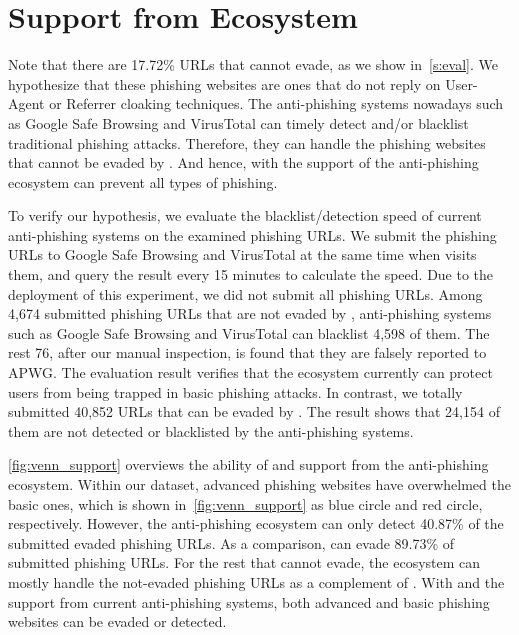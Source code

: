 \section{Support from Ecosystem}

Note that there are 17.72\% URLs that \spartacus cannot evade,
as we show in~\autoref{s:eval}.
We hypothesize that these phishing websites are ones that do not reply on User-Agent or Referrer cloaking techniques.
The anti-phishing systems nowadays such as Google Safe Browsing and VirusTotal can timely detect and/or blacklist traditional phishing attacks.
Therefore, they can handle the phishing websites that cannot be evaded by \spartacus.
And hence, \spartacus with the support of the anti-phishing ecosystem can prevent all types of phishing.

To verify our hypothesis, we evaluate the blacklist/detection speed of current anti-phishing systems on the examined phishing URLs.
We submit the phishing URLs to Google Safe Browsing and VirusTotal at the same time when \spartacus visits them, and query the result every 15 minutes to calculate the speed.
Due to the deployment of this experiment, we did not submit all phishing URLs.
Among 4,674 submitted phishing URLs that are not evaded by \spartacus, anti-phishing systems such as Google Safe Browsing and VirusTotal can blacklist 4,598 of them.
The rest 76, after our manual inspection, is found that they are falsely reported to APWG.
The evaluation result verifies that the ecosystem currently can protect users from being trapped in basic phishing attacks.
In contrast, we totally submitted 40,852 URLs that can be evaded by \spartacus.
The result shows that 24,154 of them are not detected or blacklisted by the anti-phishing systems.



\autoref{fig:venn_support} overviews the ability of \spartacus and support from the anti-phishing ecosystem.
Within our dataset, advanced phishing websites have overwhelmed the basic ones, which is shown in~\autoref{fig:venn_support} as blue circle and red circle, respectively.
However, the anti-phishing ecosystem can only detect 40.87\% of the submitted evaded phishing URLs.
As a comparison, \spartacus can evade 89.73\% of submitted phishing URLs.
For the rest that \spartacus cannot evade,
the ecosystem can mostly handle the not-evaded phishing URLs as a complement of \spartacus.
With \spartacus and the support from current anti-phishing systems, 
both advanced and basic phishing websites can be evaded or detected.

